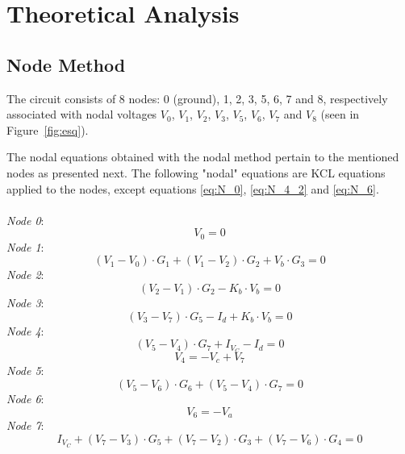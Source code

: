 \section{Theoretical Analysis}
\label{sec:analysis}

\subsection{Node Method}
\label{subsec:node}


The circuit consists of 8 nodes: 0 (ground), 1, 2, 3, 5, 6, 7 and 8, respectively associated with nodal voltages $V_0$, $V_1$, $V_2$, $V_3$, $V_5$, $V_6$, $V_7$ and $V_8$ (seen in Figure~\ref{fig:esq}). 

The nodal equations obtained with the nodal method pertain to the mentioned nodes as presented next. 
The following "nodal" equations are KCL equations applied to the nodes, except equations \ref{eq:N_0}, \ref{eq:N_4_2} 
and \ref{eq:N_6}. \\
\\
\textit{Node 0}:
\begin{equation}
  V_0=0
  \label{eq:N_0}
\end{equation}
\textit{Node 1}:
\begin{equation}
    (V_1 - V_0) \cdot G_1 + (V_1 - V_2) \cdot G_2 + V_b \cdot G_3 = 0
    \label{eq:N_1}
\end{equation}
\textit{Node 2}:
\begin{equation}
    (V_2 - V_1) \cdot G_2 - K_b \cdot V_b = 0
    \label{eq:N_2}
\end{equation}
\textit{Node 3}:
\begin{equation}
    (V_3 - V_7) \cdot G_5 - I_d + K_b \cdot V_b = 0
    \label{eq:N_3}
\end{equation}
\textit{Node 4}:
\begin{equation}
    (V_5 - V_4) \cdot G_7 + I_{V_C} - I_d = 0
    \label{eq:N_4_1}
\end{equation}
\begin{equation}
    V_4 = - V_c + V_7
    \label{eq:N_4_2}
\end{equation}
\textit{Node 5}:
\begin{equation}
  (V_5 - V_6) \cdot G_6 + (V_5 - V_4) \cdot G_7 = 0
  \label{eq:N_5}
\end{equation}
\textit{Node 6}:
\begin{equation}
    V_6 = - V_a
  \label{eq:N_6}
\end{equation}
\textit{Node 7}:
\begin{equation}
  I_{V_C} + (V_7 - V_3) \cdot G_5 + (V_7 - V_2) \cdot G_3 + (V_7 - V_6) \cdot G_4 = 0
  \label{eq:N_7}
\end{equation}

